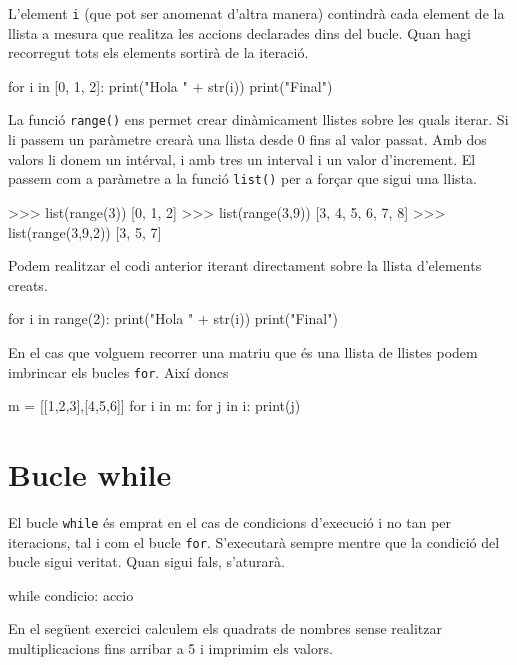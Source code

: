 L'element {\tt i} (que pot ser anomenat d'altra manera) contindrà cada element de la llista a mesura que realitza les accions declarades dins del bucle. Quan hagi recorregut tots els elements sortirà de la iteració.

\begin{tip}[caption=Bucle for]
for i in [0, 1, 2]:
    print("Hola " + str(i))
print("Final")
\end{tip}


La funció {\tt range()} ens permet crear dinàmicament llistes sobre les quals iterar. Si li passem un paràmetre crearà una llista desde 0 fins al valor passat. Amb dos valors li donem un intérval, i amb tres un interval i un valor d'increment. El passem com a paràmetre a la funció {\tt list()} per a forçar que sigui una llista.

\begin{blockcode}
>>> list(range(3))
[0, 1, 2]
>>> list(range(3,9))
[3, 4, 5, 6, 7, 8]
>>> list(range(3,9,2))
[3, 5, 7]
\end{blockcode}

Podem realitzar el codi anterior iterant directament sobre la llista d'elements creats.

\begin{blockcode}
for i in range(2):
    print("Hola " + str(i))
print("Final")
\end{blockcode}

En el cas que volguem recorrer una matriu que és una llista de llistes podem imbrincar els bucles {\tt for}. Així doncs

\begin{tip}[caption=Bucles imbrincats]
m = [[1,2,3],[4,5,6]]
for i in m:
	for j in i:
		print(j)
\end{tip}



\section{Bucle while}

El bucle {\tt while} és emprat en el cas de condicions d'execució i no tan per iteracions, tal i com el bucle {\tt for}. S'executarà sempre mentre que la condició del bucle sigui veritat. Quan sigui fals, s'aturarà.

\begin{blockcode}
while condicio:
  accio
\end{blockcode}

En el següent exercici calculem els quadrats de nombres sense realitzar multiplicacions fins arribar a 5 i imprimim els valors.

